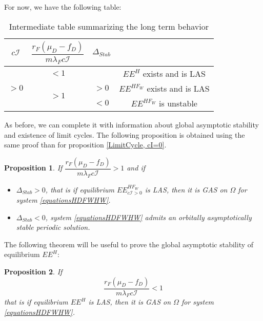 \documentclass{article}
\newcommand{\lfw}{\lambda_{F}}
\newcommand{\lfw}{\lambda_{F}}
\newcommand{\cI}{c \mathcal{I}}
\newtheorem{prop}{Proposition}
\begin{document}
For now, we have the following table:
\begin{table}[ht!]
\def\arraystretch{2}
\centering
\begin{tabular}{c|c|c|c}
$c\mathcal{I}$ & $\dfrac{r_F(\mu_D-f_D)}{m\lfw c\mathcal{I}} $ & $\Delta_{Stab}$ & \\
\hline
\multirow{3}{*}{$>0$} & $<1$ & &$EE^{H}$ exists and is LAS \\
\cline{2-4}
 & \multirow{2}{*}{$> 1$}  & $>0$ &$EE^{HF_W}$ exists and is LAS\\
 \cline{3-4}
 & & $ < 0$ & $EE^{HF_W}$ is unstable \\
\end{tabular}
\caption{Intermediate table summarizing the long term behavior}
\end{table}

As before, we can complete it with information about global asymptotic stability and existence of limit cycles. The following proposition is obtained using the same proof than for proposition \ref{LimitCycle, cI=0}.

\begin{prop}
If $\dfrac{r_F (\mu_D - f_D)}{m \lfw c \mathcal{I}} > 1$ and if 

\begin{itemize}
\item $\Delta_{Stab} > 0$, that is if equilibrium $EE^{HF_W}_{\cI >0}$ is LAS, then it is GAS on $\Omega$ for system \eqref{equationsHDFWHW}.
\item $\Delta_{Stab} < 0$, system \eqref{equationsHDFWHW} admits an orbitally asymptotically stable periodic solution.
\end{itemize}

\end{prop}

The following theorem will be useful to prove the global asymptotic stability of equilibrium $EE^{H}$:

\begin{prop}
If $$\dfrac{r_F(\mu_D-f_D)}{m\lfw c\mathcal{I}} < 1$$
that is if equilibrium $EE^{H}$ is LAS, then it is GAS on $\Omega$ for system \eqref{equationsHDFWHW}.
\end{prop}
\end{document}
